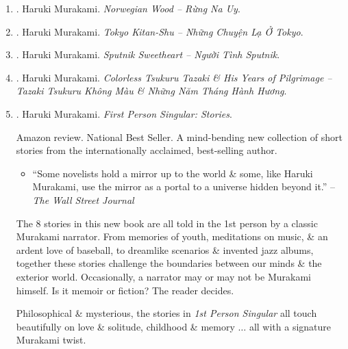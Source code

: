 \documentclass{article}
\begin{document}
\begin{enumerate}
	\item \cite{Murakami_Norwegian_wood_VN}. {\sc Haruki Murakami}. {\it Norwegian Wood -- Rừng Na Uy}.\hfill{\sf[done]}

	\item \cite{Murakami_Tokyo_VN}. {\sc Haruki Murakami}. {\it Tokyo Kitan-Shu -- Những Chuyện Lạ Ở Tokyo}.\hfill{\sf[done]}

	\item \cite{Murakami_Sputnik_VN}. Haruki Murakami. {\it Sputnik Sweetheart -- Người Tình Sputnik}.\hfill{\sf[done]}

	\item \cite{Murakami_Tsukuru_Tazaki_VN}. Haruki Murakami. {\it Colorless Tsukuru Tazaki \& His Years of Pilgrimage -- Tazaki Tsukuru Không Màu \& Những Năm Tháng Hành Hương}.\hfill{\sf[done]}

	\item \cite{Murakami_1st_person}. {\sc Haruki Murakami}. {\it First Person Singular: Stories}. {}

	{\sf Amazon review.} National Best Seller. A mind-bending new collection of short stories from the internationally acclaimed, best-selling author.
	\begin{itemize}
		\item ``Some novelists hold a mirror up to the world \& some, like {\sc Haruki Murakami}, use the mirror as a portal to a universe hidden beyond it.'' -- {\it The Wall Street Journal}
	\end{itemize}
	The 8 stories in this new book are all told in the 1st person by a classic {\sc Murakami} narrator. From memories of youth, meditations on music, \& an ardent love of baseball, to dreamlike scenarios \& invented jazz albums, together these stories challenge the boundaries between our minds \& the exterior world. Occasionally, a narrator may or may not be {\sc Murakami} himself. Is it memoir or fiction? The reader decides.

	Philosophical \& mysterious, the stories in {\it1st Person Singular} all touch beautifully on love \& solitude, childhood \& memory $\ldots$ all with a signature {\sc Murakami} twist.


\end{enumerate}
\end{document}

